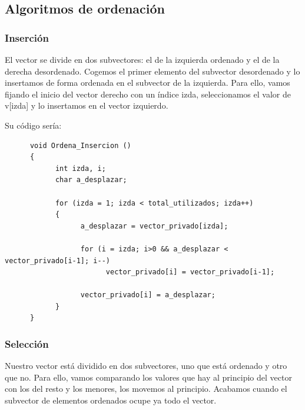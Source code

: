\documentclass[10pt,a4paper,spanish]{report}
\begin{document}
            \subsection{\textcolor[rgb]{0.5,0.8,0.1}Algoritmos de ordenación}
                  \subsubsection{\textcolor[rgb]{0.5,0.8,0.1}Inserción}
                        \noindent
                        El vector se divide en dos subvectores: el de la izquierda ordenado y el de la derecha desordenado. Cogemos el primer elemento del subvector desordenado y lo insertamos de forma ordenada en el subvector de la izquierda. Para ello, vamos fijando el inicio del vector derecho con un índice izda, seleccionamos el valor de v[izda] y lo insertamos en el vector izquierdo.

            \noindent
            Su código sería:
      \begin{verbatim}
      void Ordena_Insercion ()
      {
            int izda, i;
            char a_desplazar;

            for (izda = 1; izda < total_utilizados; izda++)
            {
                  a_desplazar = vector_privado[izda];

                  for (i = izda; i>0 && a_desplazar < vector_privado[i-1]; i--)
                        vector_privado[i] = vector_privado[i-1];

                  vector_privado[i] = a_desplazar;
            }
      }
      \end{verbatim}
                  \subsubsection{\textcolor[rgb]{0.5,0.8,0.1}Selección}
                        \noindent
                        Nuestro vector está dividido en dos subvectores, uno que está ordenado y otro que no. Para ello, vamos comparando los valores que hay al principio del vector con los del resto y los menores, los movemos al principio. Acabamos cuando el subvector de elementos ordenados ocupe ya todo el vector.
\end{document}
